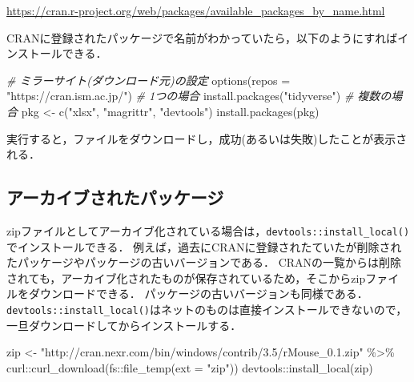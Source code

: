 \documentclass[
]{article}
\newenvironment{Shaded}{\begin{snugshade}}{\end{snugshade}}
\newcommand{\AttributeTok}[1]{\textcolor[rgb]{0.77,0.63,0.00}{#1}}
\newcommand{\CommentTok}[1]{\textcolor[rgb]{0.56,0.35,0.01}{\textit{#1}}}
\newcommand{\FunctionTok}[1]{\textcolor[rgb]{0.00,0.00,0.00}{#1}}
\newcommand{\NormalTok}[1]{#1}
\newcommand{\OtherTok}[1]{\textcolor[rgb]{0.56,0.35,0.01}{#1}}
\newcommand{\SpecialCharTok}[1]{\textcolor[rgb]{0.00,0.00,0.00}{#1}}
\newcommand{\StringTok}[1]{\textcolor[rgb]{0.31,0.60,0.02}{#1}}
\begin{document}
\url{https://cran.r-project.org/web/packages/available_packages_by_name.html}

CRANに登録されたパッケージで名前がわかっていたら，以下のようにすればインストールできる．

\begin{Shaded}
\begin{Highlighting}[]
  \CommentTok{\# ミラーサイト(ダウンロード元)の設定}
\FunctionTok{options}\NormalTok{(}\AttributeTok{repos =} \StringTok{"https://cran.ism.ac.jp/"}\NormalTok{)}
  \CommentTok{\# 1つの場合}
\FunctionTok{install.packages}\NormalTok{(}\StringTok{"tidyverse"}\NormalTok{)}
  \CommentTok{\# 複数の場合}
\NormalTok{pkg }\OtherTok{\textless{}{-}} \FunctionTok{c}\NormalTok{(}\StringTok{"xlsx"}\NormalTok{, }\StringTok{"magrittr"}\NormalTok{, }\StringTok{"devtools"}\NormalTok{)}
\FunctionTok{install.packages}\NormalTok{(pkg)}
\end{Highlighting}
\end{Shaded}

実行すると，ファイルをダウンロードし，成功(あるいは失敗)したことが表示される．

\hypertarget{ux30a2ux30fcux30abux30a4ux30d6ux3055ux308cux305fux30d1ux30c3ux30b1ux30fcux30b8}{%
\subsection{アーカイブされたパッケージ}\label{ux30a2ux30fcux30abux30a4ux30d6ux3055ux308cux305fux30d1ux30c3ux30b1ux30fcux30b8}}

zipファイルとしてアーカイブ化されている場合は，\texttt{devtools::install\_local()}でインストールできる．
例えば，過去にCRANに登録されたていたが削除されたパッケージやパッケージの古いバージョンである．
CRANの一覧からは削除されても，アーカイブ化されたものが保存されているため，そこからzipファイルをダウンロードできる．
パッケージの古いバージョンも同様である．
\texttt{devtools::install\_local()}はネットのものは直接インストールできないので，一旦ダウンロードしてからインストールする．

\begin{Shaded}
\begin{Highlighting}[]
\NormalTok{zip }\OtherTok{\textless{}{-}} 
  \StringTok{"http://cran.nexr.com/bin/windows/contrib/3.5/rMouse\_0.1.zip"} \SpecialCharTok{\%\textgreater{}\%}
\NormalTok{  curl}\SpecialCharTok{::}\FunctionTok{curl\_download}\NormalTok{(fs}\SpecialCharTok{::}\FunctionTok{file\_temp}\NormalTok{(}\AttributeTok{ext =} \StringTok{"zip"}\NormalTok{))}
\NormalTok{devtools}\SpecialCharTok{::}\FunctionTok{install\_local}\NormalTok{(zip)}
\end{Highlighting}
\end{Shaded}
\end{document}
